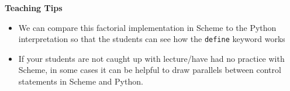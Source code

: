 \begin{blocksection}
\begin{comment}
\begin{lstlisting}
scm> (pair? (cons 1 2))
\end{lstlisting}
\begin{solution}[.25in]
\texttt{\#t}
\end{solution}

\begin{lstlisting}
scm> (list? (cons 1 2))
\end{lstlisting}
\begin{solution}[.25in]
\texttt{\#f}
\end{solution}
\end{comment}
\end{blocksection}

\begin{blocksection}
\begin{guide}
\textbf{Teaching Tips}
\begin{itemize}
  \item We can compare this factorial implementation in Scheme to the Python interpretation so that the students can see how the \lstinline{define} keyword works
  \item If your students are not caught up with lecture/have had no practice with Scheme, in some cases it can be helpful to draw parallels between control statements in Scheme and Python.
\end{itemize}
\end{guide}
\end{blocksection}
